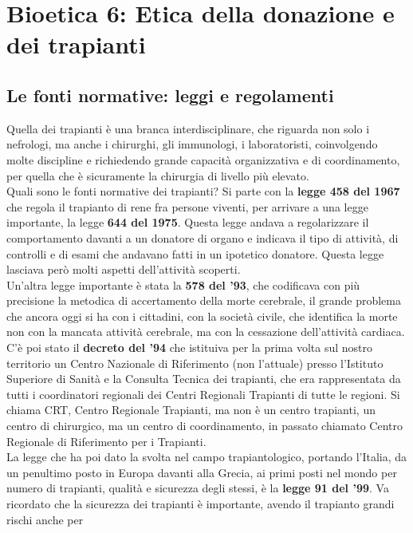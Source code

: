 
\section{Bioetica 6: Etica della donazione e dei trapianti}
 

\subsection{Le fonti normative: leggi e regolamenti}


Quella dei trapianti è una branca interdisciplinare, che riguarda non
solo i nefrologi, ma anche i chirurghi, gli immunologi, i laboratoristi,
coinvolgendo molte discipline e richiedendo grande capacità
organizzativa e di coordinamento, per quella che è sicuramente la
chirurgia di livello più elevato.
\\
Quali sono le fonti normative dei trapianti? Si parte con la
\textbf{legge 458 del 1967} che regola il trapianto di rene fra persone
viventi, per arrivare a una legge importante, la legge \textbf{644 del
1975}. Questa legge andava a regolarizzare il comportamento davanti a un
donatore di organo e indicava il tipo di attività, di controlli e di
esami che andavano fatti in un ipotetico donatore. Questa legge lasciava
però molti aspetti dell'attività scoperti.
\\
Un'altra legge importante è stata la \textbf{578 del '93}, che
codificava con più precisione la metodica di accertamento della morte
cerebrale, il grande problema che ancora oggi si ha con i cittadini, con
la società civile, che identifica la morte non con la mancata attività
cerebrale, ma con la cessazione dell'attività cardiaca.
\\
C'è poi stato il \textbf{decreto del '94} che istituiva per la prima
volta sul nostro territorio un Centro Nazionale di Riferimento (non
l'attuale) presso l'Istituto Superiore di Sanità e la Consulta Tecnica
dei trapianti, che era rappresentata da tutti i coordinatori regionali
dei Centri Regionali Trapianti di tutte le regioni. Si chiama CRT,
Centro Regionale Trapianti, ma non è un centro trapianti, un centro di
chirurgico, ma un centro di coordinamento, in passato chiamato Centro
Regionale di Riferimento per i Trapianti.
\\
La legge che ha poi dato la svolta nel campo trapiantologico, portando
l'Italia, da un penultimo posto in Europa davanti alla Grecia, ai primi
posti nel mondo per numero di trapianti, qualità e sicurezza degli
stessi, è la \textbf{legge 91 del '99}. Va ricordato che la sicurezza
dei trapianti è importante, avendo il trapianto grandi rischi anche per
